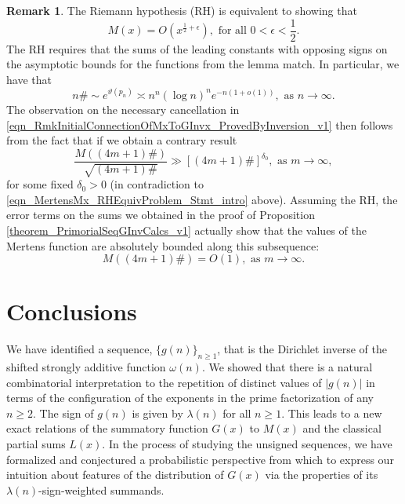 \documentclass[11pt,reqno,a4letter]{article}
\newcommand{\hlocalref}[1]{\hyperref[#1]{\ref{#1}}}
\numberwithin{equation}{section}
\numberwithin{figure}{section}
\numberwithin{table}{section}
\theoremstyle{plain}
\numberwithin{theorem}{section}
\theoremstyle{definition}
\newtheorem{remark}[theorem]{Remark}
\begin{document}
\begin{remark}
\label{remark_LocalCancellationWithGxAlongThePrimorialsUnderTheRH} 
The Riemann hypothesis (RH) is equivalent to showing that 
\begin{equation} 
\label{eqn_MertensMx_RHEquivProblem_Stmt_intro} 
M(x) = O\left(x^{\frac{1}{2}+\epsilon}\right), \text{ for all } 0 < \epsilon < \frac{1}{2}.
\end{equation}
The RH requires that the sums of the leading constants with opposing signs 
on the asymptotic bounds for the functions from the lemma match. 
In particular, we have that 
\cite{DUSART-1999,DUSART-2010} 
\[
n\# \sim e^{\vartheta(p_n)} \asymp n^n (\log n)^n e^{-n(1+o(1))}, 
     \text{ as } n \rightarrow \infty. 
\]
The observation on the necessary cancellation in 
\eqref{eqn_RmkInitialConnectionOfMxToGInvx_ProvedByInversion_v1}
then follows from the fact that if we obtain a contrary result  
\[
\frac{M((4m+1)\#)}{\sqrt{(4m+1)\#}} \gg \left[(4m+1)\#\right]^{\delta_0}, 
     \text{ as } m \rightarrow \infty, 
\]
for some fixed $\delta_0 > 0$ 
(in contradiction to \eqref{eqn_MertensMx_RHEquivProblem_Stmt_intro} above). 
Assuming the RH, the error terms on the sums we obtained in the proof of 
Proposition \hlocalref{theorem_PrimorialSeqGInvCalcs_v1} actually show that 
the values of the Mertens function are absolutely bounded along this subsequence: 
$$M((4m+1)\#) = O(1), \text{ as } m \rightarrow \infty.$$ 
\end{remark}

\section{Conclusions}

We have identified a sequence, 
$\{g(n)\}_{n \geq 1}$, that is the Dirichlet inverse of the 
shifted strongly additive function $\omega(n)$. 
We showed that there is a natural 
combinatorial interpretation to the repetition of distinct values 
of $|g(n)|$ in terms of the configuration of the 
exponents in the prime factorization of any $n \geq 2$. 
The sign of $g(n)$ is given by $\lambda(n)$ for all $n \geq 1$. 
This leads to a new exact relations of the 
summatory function $G(x)$ to $M(x)$ and the classical partial sums $L(x)$. 
In the process of studying the unsigned sequences, 
we have formalized and conjectured a probabilistic perspective from which to express 
our intuition about features of the distribution of $G(x)$ 
via the properties of its $\lambda(n)$-sign-weighted summands.
\end{document}
